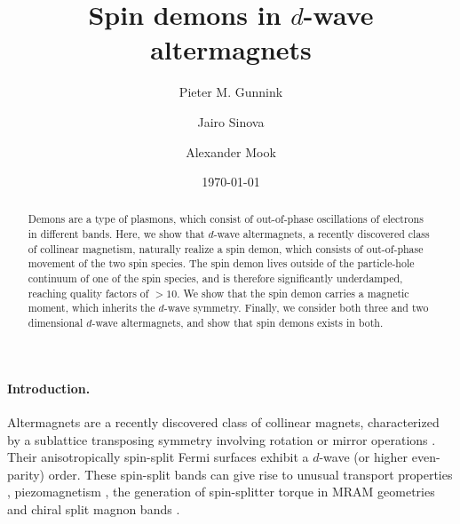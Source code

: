 \documentclass[aps,prl,reprint,twocolumns,superscriptaddress]{revtex4-2}
\begin{document}
	\title{Spin demons in $d$-wave altermagnets}
	\date{\today}

	\author{Pieter M. Gunnink}
	\author{Jairo Sinova}
	\author{Alexander Mook}
	\address{Johannes Gutenberg University Mainz, Staudingerweg 7, Mainz 55128, Germany}
	\begin{abstract}
		Demons are a type of plasmons, which consist of out-of-phase oscillations of electrons in different bands. Here, we show that $d$-wave altermagnets, a recently discovered class of collinear magnetism, naturally realize a spin demon, which consists of out-of-phase movement of the two spin species.
		The spin demon lives outside of the particle-hole continuum of one of the spin species, and is therefore significantly underdamped, reaching quality factors of $>10$. We show that the spin demon carries a magnetic moment, which inherits the $d$-wave symmetry. Finally, we consider both three and two dimensional $d$-wave altermagnets, and show that spin demons exists in both.
	\end{abstract}

	\maketitle

	
	\paragraph{Introduction.}
	Altermagnets are a recently discovered class of collinear magnets, characterized by a sublattice transposing symmetry involving rotation or mirror operations \cite{smejkalConventionalFerromagnetismAntiferromagnetism2022,smejkalEmergingResearchLandscape2022}. Their anisotropically spin-split Fermi surfaces exhibit a $d$-wave (or higher even-parity) order. These spin-split bands can give rise to unusual transport properties \cite{smejkalEmergingResearchLandscape2022,zarzuelaTransportTheorySpintransfer2024,liaoSeparationInverseAltermagnetic2024}, piezomagnetism \cite{aoyamaPiezomagneticPropertiesAltermagnetic2024,yershovFluctuationinducedPiezomagnetismLocal2024}, the generation of spin-splitter torque in
	MRAM geometries \cite{karubeObservationSpinSplitterTorque2022} and chiral split magnon bands \cite{nakaSpinCurrentGeneration2019,liuChiralSplitMagnon2024, smejkalChiralMagnonsAltermagnetic2023}.
\end{document}
